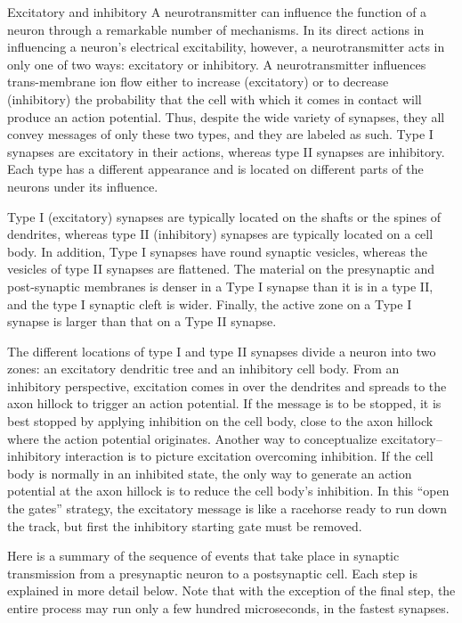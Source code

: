 Excitatory and inhibitory
A neurotransmitter can influence the function of a neuron through a remarkable number of mechanisms. In its direct actions in influencing a neuron's electrical excitability, however, a neurotransmitter acts in only one of two ways: excitatory or inhibitory. A neurotransmitter influences trans-membrane ion flow either to increase (excitatory) or to decrease (inhibitory) the probability that the cell with which it comes in contact will produce an action potential. Thus, despite the wide variety of synapses, they all convey messages of only these two types, and they are labeled as such. Type I synapses are excitatory in their actions, whereas type II synapses are inhibitory. Each type has a different appearance and is located on different parts of the neurons under its influence.

Type I (excitatory) synapses are typically located on the shafts or the spines of dendrites, whereas type II (inhibitory) synapses are typically located on a cell body. In addition, Type I synapses have round synaptic vesicles, whereas the vesicles of type II synapses are flattened. The material on the presynaptic and post-synaptic membranes is denser in a Type I synapse than it is in a type II, and the type I synaptic cleft is wider. Finally, the active zone on a Type I synapse is larger than that on a Type II synapse.

The different locations of type I and type II synapses divide a neuron into two zones: an excitatory dendritic tree and an inhibitory cell body. From an inhibitory perspective, excitation comes in over the dendrites and spreads to the axon hillock to trigger an action potential. If the message is to be stopped, it is best stopped by applying inhibition on the cell body, close to the axon hillock where the action potential originates. Another way to conceptualize excitatory--inhibitory interaction is to picture excitation overcoming inhibition. If the cell body is normally in an inhibited state, the only way to generate an action potential at the axon hillock is to reduce the cell body's inhibition. In this ``open the gates'' strategy, the excitatory message is like a racehorse ready to run down the track, but first the inhibitory starting gate must be removed.

Here is a summary of the sequence of events that take place in synaptic transmission from a presynaptic neuron to a postsynaptic cell. Each step is explained in more detail below. Note that with the exception of the final step, the entire process may run only a few hundred microseconds, in the fastest synapses.

